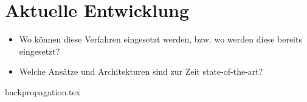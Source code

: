 \part{Aktuelle Entwicklung}



\begin{itemize}
\item Wo können diese Verfahren eingesetzt werden, bzw. wo werden diese bereits eingesetzt?
\item Welche Ansätze und Architekturen sind zur Zeit state-of-the-art?
\end{itemize}

{backpropagation.tex}
\clearpage

